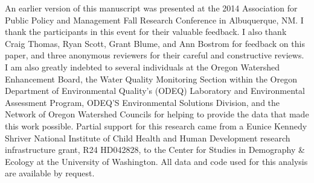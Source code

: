 \documentclass[12pt,a4paper,titlepage]{article}
\begin{document}
An earlier version of this manuscript was presented at the 2014 Association for Public Policy and Management Fall Research Conference in Albuquerque, NM. I thank the participants in this event for their valuable feedback. I also thank Craig Thomas, Ryan Scott, Grant Blume, and Ann Bostrom for feedback on this paper, and three anonymous reviewers for their careful and constructive reviews. I am also greatly indebted to several individuals at the Oregon Watershed Enhancement Board, the Water Quality Monitoring Section within the Oregon Department of Environmental Quality’s (ODEQ) Laboratory and Environmental Assessment Program, ODEQ’S Environmental Solutions Division, and the Network of Oregon Watershed Councils for helping to provide the data that made this work possible. Partial support for this research came from a Eunice Kennedy Shriver National Institute of Child Health and Human Development research infrastructure grant, R24 HD042828, to the Center for Studies in Demography \& Ecology at the University of Washington. All data and code used for this analysis are available by request.

\printbibliography
\end{document}
